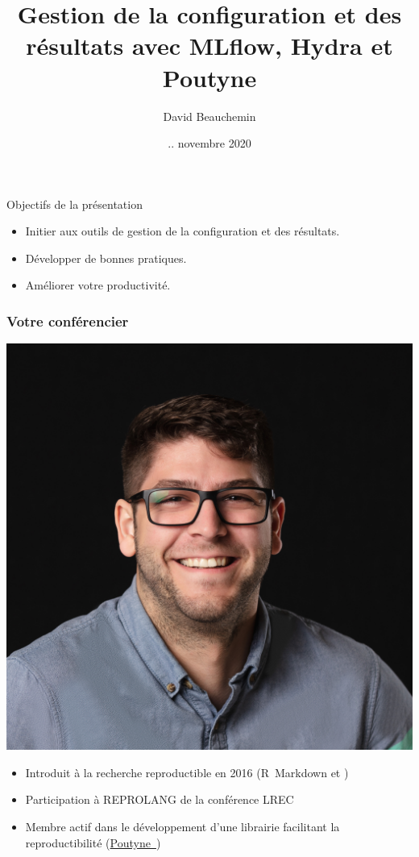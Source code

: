 \documentclass[aspectratio=169,10pt,xcolor=x11names,english,french]{beamer}
\title{Gestion de la configuration et des résultats avec MLflow, Hydra et Poutyne}
\author{David Beauchemin}
\date{.. novembre 2020}
\newcommand{\link}[2]{\href{#1}{#2~{\smaller\faExternalLink*}}}
\begin{document}
	
	
	
	
	\begin{frame}{Objectifs de la présentation}
		\begin{itemize}
			\item Initier aux outils de gestion de la configuration et des résultats.
			\item Développer de bonnes pratiques.
			\item Améliorer votre productivité.
		\end{itemize}
	\end{frame}
	
	\begin{frame}
		\frametitle{Votre conférencier}
		
		\begin{minipage}{0.25\linewidth}
			\includegraphics[width=\linewidth,keepaspectratio]{img/david}
		\end{minipage}
		\hfill
		\begin{minipage}{0.70\linewidth}
			\begin{itemize}
				\item Introduit à la recherche reproductible en 2016 (\mbox{R Markdown} et \faGit)
				\item Participation à REPROLANG de la conférence LREC \cite{garneau2020robust}
				\item Membre actif dans le développement d'une librairie facilitant la reproductibilité (\link{https://poutyne.org/}{Poutyne})
			\end{itemize}
		\end{minipage}
		

\end{frame}
\end{document}
